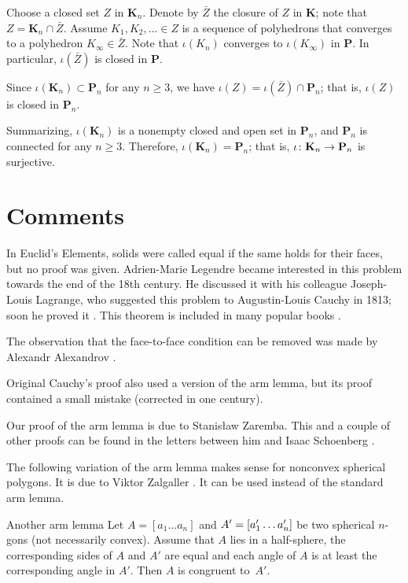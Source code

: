 Choose a closed set $Z$ in $\mathbf{K}_n$.
Denote by $\bar Z$ the closure of $Z$ in $\mathbf{K}$; note that $Z=\mathbf{K}_n\cap \bar Z$.
Assume $K_1,K_2,\dots\in Z$ is a sequence of polyhedrons that converges to a polyhedron $K_\infty\in\bar Z$.
Note that $\iota(K_n)$ converges to $\iota(K_\infty)$ in $\mathbf{P}$.
In particular, $\iota(\bar Z)$ is closed in $\mathbf{P}$.

Since $\iota(\mathbf{K}_n)\subset \mathbf{P}_n$ for any $n\ge 3$, we have $\iota (Z)=\iota(\bar Z)\cap \mathbf{P}_n$;
that is, $\iota (Z)$ is closed in $\mathbf{P}_n$. 

\medskip

Summarizing, $\iota(\mathbf{K}_n)$ is a nonempty closed and open set in $\mathbf{P}_n$, and $\mathbf{P}_n$ is connected for any $n\ge 3$.
Therefore, $\iota(\mathbf{K}_n)=\mathbf{P}_n$; that is, $\iota\:\mathbf{K}_n\z\to\mathbf{P}_n$ is surjective.
\qeds

\section{Comments}

In Euclid's Elements, 
solids were called equal if the same holds for their faces, but no proof was given.
Adrien-Marie Legendre became interested in this problem towards the end of the 18th century.
He discussed it with his colleague Joseph-Louis Lagrange, who suggested this problem to Augustin-Louis Cauchy in 1813; soon he proved it \cite{cauchy}.
This theorem is included in many popular books \cite{aigner-zigler,dolbilin,tabacnikov-fuks}.

The observation that the face-to-face condition can be removed was made by 
Alexandr Alexandrov \cite{alexandrov-1941}.

Original Cauchy's proof \cite{cauchy}
also used a version of the arm lemma, but its proof contained a small mistake (corrected in one century).

Our proof of the arm lemma is due to Stanisław Zaremba.
This and a couple of other proofs can be found in the letters between him and Isaac Schoenberg \cite{schoenberg-zaremba}.

The following variation of the arm lemma makes sense for nonconvex spherical polygons.
It is due to Viktor Zalgaller \cite{zalgaller}.
It can be used instead of the standard arm lemma.

\begin{thm}{Another arm lemma}
Let $A=[a_1\dots a_n]$ and $A'\z=[a'_1\z\dots a'_n]$ be two spherical $n$-gons (not necessarily convex).
Assume that $A$ lies in a half-sphere,
the corresponding sides of $A$ and $A'$ are equal
and each angle of $A$ is at least the corresponding angle in $A'$.
Then $A$ is congruent to~$A'$. 
\end{thm}

